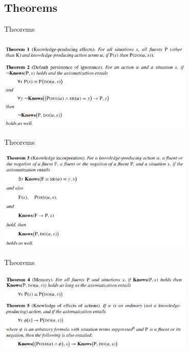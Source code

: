 \subsection{Theorems}

\begin{frame}{Theorems}

    \begin{center}
        \includegraphics[width=0.7\textwidth]{assets/theorem1.png}
        \includegraphics[width=0.7\textwidth]{assets/theorem2.png}
    \end{center}

\end{frame}    

\begin{frame}{Theorems}
    \begin{center}
        \includegraphics[width=0.7\textwidth]{assets/theorem3.png}
    \end{center}
\end{frame} 

\begin{frame}{Theorems}
    \begin{center}
        \includegraphics[width=0.7\textwidth]{assets/theorem4.png}
        \includegraphics[width=0.7\textwidth]{assets/theorem5.png}
    \end{center}
\end{frame} 

